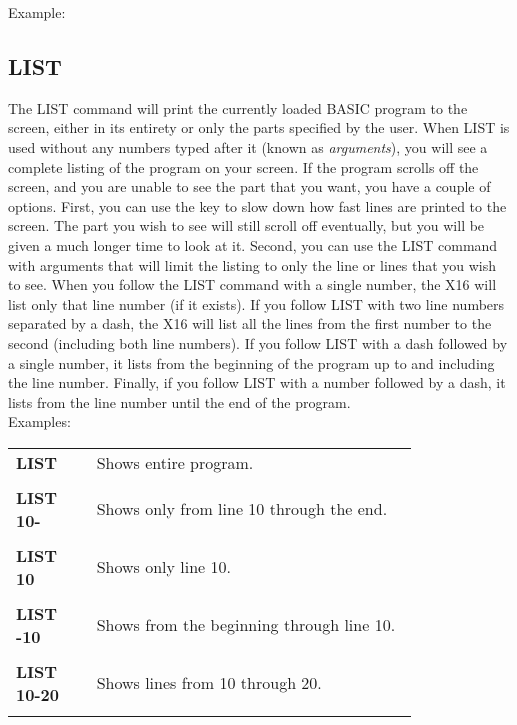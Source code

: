 Example:\\


\subsection{LIST}

The {\ttfamily LIST} command will print the currently loaded BASIC program to
the screen, either in its entirety or only the parts specified by the user.
When {\ttfamily LIST} is used without any numbers typed after it (known as
\emph{arguments}), you will see a complete listing of the program on your
screen.  If the program scrolls off the screen, and you are unable to see the
part that you want, you have a couple of options.  First, you can use the
 key to slow down how fast lines are printed to the screen.  The
part you wish to see will still scroll off eventually, but you will be given a
much longer time to look at it.  Second, you can use the {\ttfamily LIST}
command with arguments that will limit the listing to only the line or lines
that you wish to see.  When you follow the {\ttfamily LIST} command with a
single number, the X16 will list only that line number (if it exists).  If you
follow {\ttfamily LIST} with two line numbers separated by a dash, the X16 will
list all the lines from the first number to the second (including both line
numbers).  If you follow {\ttfamily LIST} with a dash followed by a single
number, it lists from the beginning of the program up to and including the line
number.  Finally, if you follow {\ttfamily LIST} with a number followed by a
dash, it lists from the line number until the end of the program.\\

Examples:\\

\begin{tabular}{l p{0.8\linewidth}}
	{\ttfamily\bfseries LIST}&Shows entire program.\\\\
	{\ttfamily\bfseries LIST 10-}&Shows only from line 10 through the end.\\\\
	{\ttfamily\bfseries LIST 10}&Shows only line 10.\\\\
	{\ttfamily\bfseries LIST -10}&Shows from the beginning through line 10.\\\\
	{\ttfamily\bfseries LIST 10-20}&Shows lines from 10 through 20.\\\\
\end{tabular}

